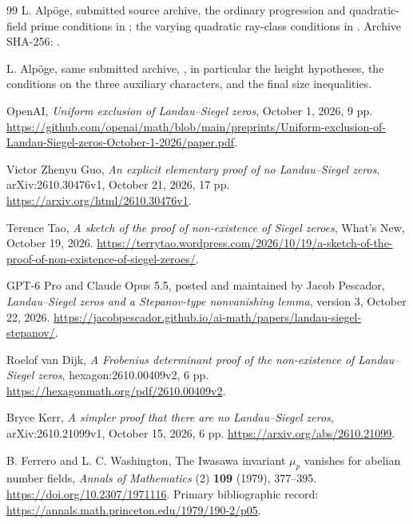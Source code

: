 \documentclass[11pt,a4paper]{article}
\theoremstyle{remark}
\begin{document}
\begin{thebibliography}{99}
L. Alp\"oge, submitted source archive, the ordinary progression
and quadratic-field prime conditions in
;
the varying quadratic ray-class conditions in
.
Archive SHA-256:
.

L. Alp\"oge, same submitted archive,
,
in particular the height hypotheses, the conditions on the
three auxiliary characters, and the final size inequalities.

OpenAI, \emph{Uniform exclusion of Landau--Siegel zeros},
October 1, 2026, 9 pp.
\url{https://github.com/openai/math/blob/main/preprints/Uniform-exclusion-of-Landau-Siegel-zeros-October-1-2026/paper.pdf}.

Victor Zhenyu Guo, \emph{An explicit elementary proof of no Landau--Siegel zeros},
arXiv:2610.30476v1, October 21, 2026, 17 pp.
\url{https://arxiv.org/html/2610.30476v1}.

Terence Tao, \emph{A sketch of the proof of non-existence of Siegel zeroes},
What's New, October 19, 2026.
\url{https://terrytao.wordpress.com/2026/10/19/a-sketch-of-the-proof-of-non-existence-of-siegel-zeroes/}.

GPT-6 Pro and Claude Opus 5.5, posted and maintained by Jacob Pescador,
\emph{Landau--Siegel zeros and a Stepanov-type nonvanishing lemma},
version 3, October 22, 2026.
\url{https://jacobpescador.github.io/ai-math/papers/landau-siegel-stepanov/}.

Roelof van Dijk,
\emph{A Frobenius determinant proof of the non-existence of Landau--Siegel zeros},
hexagon:2610.00409v2, 6 pp.
\url{https://hexagonmath.org/pdf/2610.00409v2}.

Bryce Kerr, \emph{A simpler proof that there are no Landau--Siegel zeros},
arXiv:2610.21099v1, October 15, 2026, 6 pp.
\url{https://arxiv.org/abs/2610.21099}.

B. Ferrero and L. C. Washington,
The Iwasawa invariant $\mu_p$ vanishes for abelian number fields,
\emph{Annals of Mathematics} (2) \textbf{109} (1979), 377--395.
\url{https://doi.org/10.2307/1971116}.
Primary bibliographic record:
\url{https://annals.math.princeton.edu/1979/190-2/p05}.


\end{thebibliography}
\end{document}
